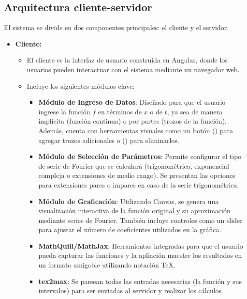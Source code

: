 \subsection{Arquitectura cliente-servidor}
El sistema se divide en dos componentes principales: el cliente y el servidor.

\begin{itemize}
	\item \textbf{Cliente:}
	\begin{itemize}
		\item El cliente es la interfaz de usuario construida en Angular, donde los usuarios pueden interactuar con el sistema mediante un navegador web.
		\item Incluye los siguientes módulos clave:
		\begin{itemize}
			\item \textbf{Módulo de Ingreso de Datos}: Diseñado para que el usuario ingrese la función \( f \) en términos de $x$ o de $t$, ya sea de manera implícita (función continua) o por partes (trozos de la función). Además, cuenta con herramientas visuales como un botón () para agregar trozos adicionales o () para eliminarlos.
			\item \textbf{Módulo de Selección de Parámetros}: Permite configurar el tipo de serie de Fourier que se calculará (trigonométrica, exponencial compleja o extensiones de medio rango). Se presentan las opciones para extensiones pares o impares en caso de la serie trigonométrica.
			\item \textbf{Módulo de Graficación}: Utilizando Canvas, se genera una visualización interactiva de la función original y su aproximación mediante series de Fourier. También incluye controles como un slider para ajustar el número de coeficientes utilizados en la gráfica.
			\item \textbf{MathQuill/MathJax}: Herramientas integradas para que el usuario pueda capturar las funciones y la apliación muestre los resultados en un formato amigable utilizando notación TeX.
			\item \textbf{tex2max}: Se parsean todas las entradas necesarias (la función y sus intervalos) para ser enviadas al servidor y realizar los cálculos. 
		\end{itemize}
	\end{itemize}
	

\end{itemize}
